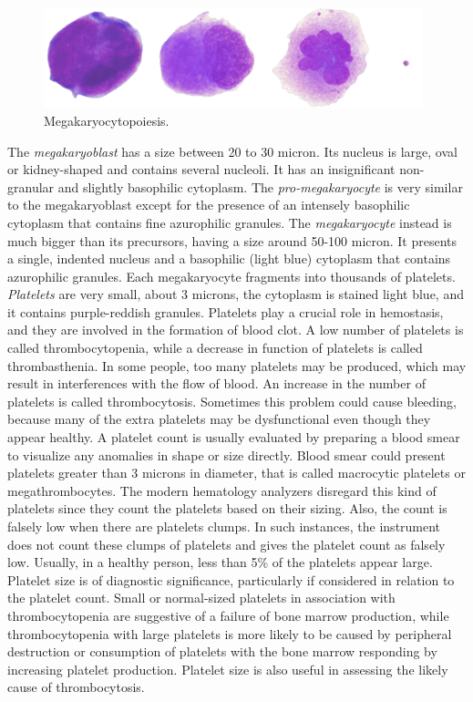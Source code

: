 \begin{figure}[!htbp]
	\centering
	\includegraphics[width=0.98\textwidth]{images/megakaryopoiesis}
	\caption{\label{fig:Megakaryocytopoiesis} Megakaryocytopoiesis.}
\end{figure}

The \textit{megakaryoblast} has a size between 20 to 30 micron. Its nucleus is large, oval or kidney-shaped and contains several nucleoli. It has an insignificant non-granular and slightly basophilic cytoplasm. The \textit{pro-megakaryocyte} is very similar to the megakaryoblast except for the presence of an intensely basophilic cytoplasm that contains fine azurophilic granules. The \textit{megakaryocyte} instead is much bigger than its precursors, having a size around 50-100 micron. It presents a single, indented nucleus and a basophilic (light blue) cytoplasm that contains azurophilic granules.
Each megakaryocyte fragments into thousands of platelets. \textit{Platelets} are very small, about 3 microns, the cytoplasm is stained light blue, and it contains purple-reddish granules. Platelets play a crucial role in hemostasis, and they are involved in the formation of blood clot. A low number of platelets is called thrombocytopenia, while a decrease in function of platelets is called thrombasthenia. In some people, too many platelets may be produced, which may result in interferences with the flow of blood.
An increase in the number of platelets is called thrombocytosis. Sometimes this problem could cause bleeding, because many of the extra platelets may be dysfunctional even though they appear healthy. A platelet count is usually evaluated by preparing a blood smear to visualize any anomalies in shape or size directly. Blood smear could present platelets greater than 3 microns in diameter, that is called macrocytic platelets or megathrombocytes. The modern hematology analyzers disregard this kind of platelets since they count the platelets based on their sizing. Also, the count is falsely low when there are platelets clumps. In such instances, the instrument does not count these clumps of platelets and gives the platelet count as falsely low. Usually, in a healthy person, less than 5\% of the platelets appear large. Platelet size is of diagnostic significance, particularly if considered in relation to the platelet count. Small or normal-sized platelets in association with thrombocytopenia are suggestive of a failure of bone marrow production, while thrombocytopenia with large platelets is more likely to be caused by peripheral destruction or consumption of platelets with the bone marrow responding by increasing platelet production. Platelet size is also useful in assessing the likely cause of thrombocytosis. 


